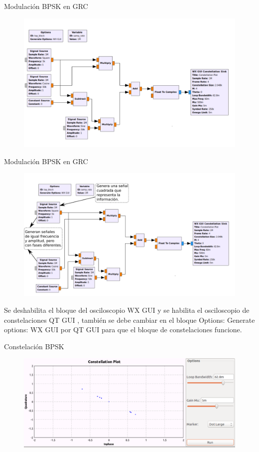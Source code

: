 \begin{frame}{Modulación BPSK en GRC}
\begin{figure}[H]
\centering
\includegraphics[width=\textwidth]{parte1/lab5/pdf/lab5_5.pdf}
\end{figure}
\end{frame}

\begin{frame}{Modulación BPSK en GRC}
\vspace{-8mm}
\begin{figure}[H]
\centering
\includegraphics[width=.9\textwidth]{parte1/lab5/pdf/lab5_6.pdf}
\end{figure}
\tiny
Se deshabilita el bloque del osciloscopio WX GUI y se habilita el osciloscopio de constelaciones QT GUI , también se debe cambiar en el bloque Options: Generate options: WX GUI por QT GUI para que el bloque de constelaciones funcione.
\end{frame}

\begin{frame}{Constelación BPSK}
\begin{figure}[H]
\centering
\includegraphics[width=\textwidth]{parte1/lab5/pdf/lab5_7.pdf}
\end{figure}
\end{frame}
